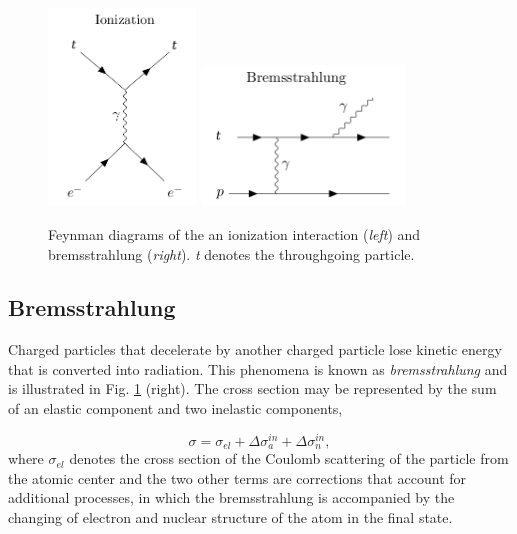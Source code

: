 \begin{figure}
\centering
\includegraphics[width = 0.35\textwidth]{chapter4/img/Feynman_Ionization_2.png}
\includegraphics[width = 0.48\textwidth]{chapter4/img/Feynman_Bremsstrahlung_2.png}
\caption{Feynman diagrams of the an ionization interaction (\textit{left}) and bremsstrahlung (\textit{right}). \textit{t} denotes the throughgoing particle.}
\label{fig:feynmanionizbrems}
\end{figure}


\subsection{Bremsstrahlung}
Charged particles that decelerate by another charged particle lose kinetic energy that is converted into radiation. This phenomena is known as \textit{bremsstrahlung} and is illustrated in Fig. \ref{fig:feynmanionizbrems} (right). The cross section may be represented by the sum of an elastic component and two inelastic components,

\begin{equation}
\sigma = \sigma_{el} + \Delta \sigma^{in}_a + \Delta \sigma^{in}_n,
\end{equation}
where $\sigma_{el}$ denotes the cross section of the Coulomb scattering of the particle from the atomic center and the two other terms are corrections that account for additional processes, in which the bremsstrahlung is accompanied by the changing of electron and nuclear structure of the atom in the final state.

